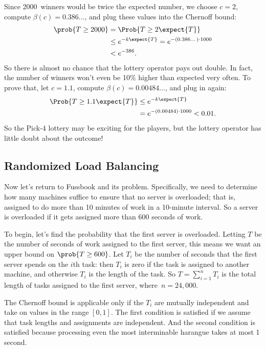 Since 2000~winners would be twice the expected number, we choose $c =
2$, compute $\beta(c) = 0.386\dots$, and plug these values
into the Chernoff bound:
\begin{align*}
\prob{T \geq 2000} & = \Prob{T \geq 2 \expect{T}} \\
  & \leq e^{-k \expect{T}} = e^{- (0.386\dots) \cdot 1000} \\
  & < e^{-386}.
\end{align*}
So there is almost no chance that the lottery operator pays out
double.  In fact, the number of winners won't even be 10\% higher than
expected very often.  To prove that, let $c = 1.1$, compute $\beta(c)
= 0.00484\dots$, and plug in again:
\begin{align*}
\Prob{T \geq 1.1 \expect{T}} & \leq e^{-k \expect{T}} \\
  & = e^{- (0.00484)\cdot 1000} < 0.01.
\end{align*}
So the Pick-4 lottery may be exciting for the players, but the lottery
operator has little doubt about the outcome!

\subsection{Randomized Load Balancing}\label{sec:load_balancing}

Now let's return to Fussbook and its  problem.
Specifically, we need to determine how many machines suffice to ensure
that no server is overloaded; that is, assigned to do more than 10
minutes of work in a 10-minute interval.  So a server is overloaded if
it gets assigned more than 600 seconds of work.

To begin, let's find the probability that the first server is
overloaded.  Letting $T$ be the number of seconds of work assigned to
the first server, this means we want an upper bound on $\prob{T \geq
  600}$.  Let $T_i$ be the number of seconds that the first server
spends on the $i$th task: then $T_i$ is zero if the task is assigned
to another machine, and otherwise $T_i$ is the length of the task.  So
$T = \sum_{i = 1}^n T_i$ is the total length of tasks assigned to the
first server, where~$n = 24{,}000$.

The Chernoff bound is applicable only if the $T_i$ are mutually
independent and take on values in the range $[0, 1]$.  The first
condition is satisfied if we assume that task lengths and assignments
are independent.  And the second condition is satisfied because
processing even the most interminable harangue takes at most 1 second.

